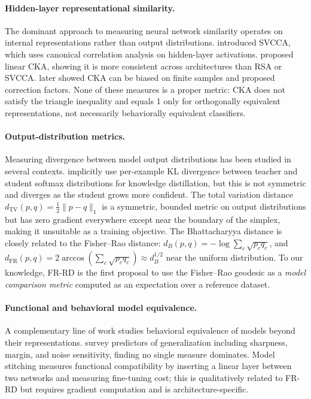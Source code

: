 \documentclass[11pt]{article}
\begin{document}
\paragraph{Hidden-layer representational similarity.}
The dominant approach to measuring neural network similarity operates on internal
representations rather than output distributions.
\citet{raghu2017svcca} introduced SVCCA, which uses canonical correlation analysis
on hidden-layer activations.
\citet{kornblith2019similarity} proposed linear CKA, showing it is more consistent
across architectures than RSA \citep{kriegeskorte2008representational} or SVCCA.
\citet{nguyen2021wide} later showed CKA can be biased on finite samples and proposed
correction factors. None of these measures is a proper metric: CKA does not satisfy
the triangle inequality and equals 1 only for orthogonally equivalent representations,
not necessarily behaviorally equivalent classifiers.

\paragraph{Output-distribution metrics.}
Measuring divergence between model output distributions has been studied in several
contexts.
\citet{hinton2015distilling} implicitly use per-example KL divergence between teacher
and student softmax distributions for knowledge distillation, but this is not symmetric
and diverges as the student grows more confident.
The total variation distance $d_{\mathrm{TV}}(p,q) = \tfrac{1}{2}\|p-q\|_1$ is a
symmetric, bounded metric on output distributions but has zero gradient everywhere
except near the boundary of the simplex, making it unsuitable as a training objective.
The Bhattacharyya distance \citep{bhattacharyya1943measure} is closely related to
the Fisher--Rao distance: $d_B(p,q) = -\log\!\sum_c\sqrt{p_c q_c}$, and
$d_{\mathrm{FR}}(p,q) = 2\arccos(\sum_c\sqrt{p_c q_c}) \approx d_B^{1/2}$
near the uniform distribution.
To our knowledge, FR-RD is the first proposal to use the Fisher--Rao geodesic as
a \emph{model comparison metric} computed as an expectation over a reference dataset.

\paragraph{Functional and behavioral model equivalence.}
A complementary line of work studies behavioral equivalence of models beyond their
representations. \citet{jiang2019fantastic} survey predictors of generalization
including sharpness, margin, and noise sensitivity, finding no single measure
dominates. Model stitching \citep{lenc2015understanding} measures functional
compatibility by inserting a linear layer between two networks and measuring
fine-tuning cost; this is qualitatively related to FR-RD but requires gradient
computation and is architecture-specific.
\end{document}
